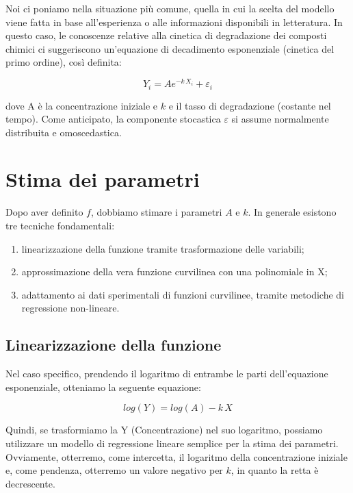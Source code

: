 \documentclass[a4paper,12pt,oneside]{book}
\providecommand{\tightlist}{%
  \setlength{\itemsep}{0pt}\setlength{\parskip}{0pt}}
\begin{document}
Noi ci poniamo nella situazione più comune, quella in cui la scelta del modello viene fatta in base all'esperienza o alle informazioni disponibili in letteratura. In questo caso, le conoscenze relative alla cinetica di degradazione dei composti chimici ci suggeriscono un'equazione di decadimento esponenziale (cinetica del primo ordine), così definita:

\[Y_i = A e^{-k \,X_i} + \varepsilon_i\]

dove A è la concentrazione iniziale e \(k\) e il tasso di degradazione (costante nel tempo). Come anticipato, la componente stocastica \(\varepsilon\) si assume normalmente distribuita e omoscedastica.

\hypertarget{stima-dei-parametri-4}{%
\section{Stima dei parametri}\label{stima-dei-parametri-4}}

Dopo aver definito \(f\), dobbiamo stimare i parametri \(A\) e \(k\). In generale esistono tre tecniche fondamentali:

\begin{enumerate}
\def\labelenumi{\arabic{enumi}.}
\tightlist
\item
  linearizzazione della funzione tramite trasformazione delle variabili;
\item
  approssimazione della vera funzione curvilinea con una polinomiale in X;
\item
  adattamento ai dati sperimentali di funzioni curvilinee, tramite metodiche di regressione non-lineare.
\end{enumerate}

\hypertarget{linearizzazione-della-funzione}{%
\subsection{Linearizzazione della funzione}\label{linearizzazione-della-funzione}}

Nel caso specifico, prendendo il logaritmo di entrambe le parti dell'equazione esponenziale, otteniamo la seguente equazione:

\[ log(Y) = log(A) - k \, X \]

Quindi, se trasformiamo la Y (Concentrazione) nel suo logaritmo, possiamo utilizzare un modello di regressione lineare semplice per la stima dei parametri. Ovviamente, otterremo, come intercetta, il logaritmo della concentrazione iniziale e, come pendenza, otterremo un valore negativo per \(k\), in quanto la retta è decrescente.
\end{document}
